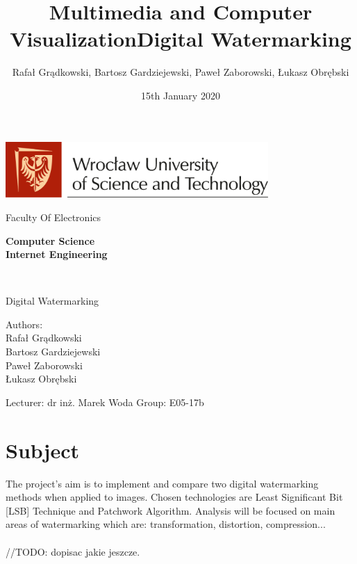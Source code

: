 \documentclass[a4paper, 12pt]{article}
\title{Multimedia and Computer Visualization}
\author{Rafał Grądkowski, Bartosz Gardziejewski, Paweł Zaborowski, Łukasz Obrębski}
\date{15th January 2020}
\begin{document}
\begin{titlepage}
    \makeatletter
    \vspace{1cm}
    \begin{center}
        \includegraphics[width=0.75\textwidth]{PWr-logo_ang.png} \par
        \vspace{0.2cm}
        \Large Faculty Of Electronics \par
        \vspace{1.25cm}
        {    
            \bfseries
            Computer Science \\
            \vspace{0.25cm}
    	    \normalsize Internet Engineering \par
    	    \vspace{2cm}
    	    \Huge \@title \\
    	}
    	\vspace{0.5cm}
        \large Digital Watermarking
    \end{center}
    \null
    \vfill
    \begin{flushright}
        Authors: \\
        Rafał Grądkowski \\
        Bartosz Gardziejewski \\
        Paweł Zaborowski \\
        Łukasz Obrębski
    \end{flushright}
    \vspace{0.5cm}
    \begin{flushleft}
        Lecturer: dr inż. Marek Woda \break
        Group: E05-17b \par
    \end{flushleft}
\end{titlepage}

\newpage
\title{Digital Watermarking}

	
\newpage
\tableofcontents

\newpage

\section{Subject}

The project's aim is to implement and compare two digital watermarking methods when applied to images. Chosen technologies are Least Significant Bit [LSB] Technique and Patchwork Algorithm.
Analysis will be focused on main areas of watermarking which are: transformation, distortion, compression...
\\ \\
//TODO: dopisac jakie jeszcze. 
\end{document}
